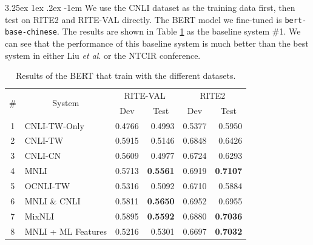 \documentclass[12pt]{article}
\makeatletter
\renewcommand\paragraph{\@startsection{paragraph}{5}{\z@}%
  {3.25ex \@plus1ex \@minus.2ex}%
  {-1em}%
  {\normalfont\normalsize\bfseries}}
\makeatother
\begin{document}
\begin{CJK*}{UTF8}{bkai}
\begin{spacing}{1.77}
\paragraph{}
We use the CNLI dataset as the training data first, then test on RITE2 and RITE-VAL directly. The BERT model we fine-tuned is \texttt{bert-base-chinese}. The results are shown in Table \ref{result:bert_compare} as the baseline system \#1. We can see that the performance of this baseline system is much better than the best system in either Liu \emph{et al}. or the NTCIR conference.

\begin{table}[H]
  \centering
  \setlength{\extrarowheight}{-3pt}
  \begin{tabular}{|c|l|r|r|r|r|}
  \hline
  \multirow{2}{*}{\#} & \multicolumn{1}{c|}{\multirow{2}{*}{System}} & \multicolumn{2}{c|}{RITE-VAL} & \multicolumn{2}{c|}{RITE2} \\ \cline{3-6}
   & \multicolumn{1}{c|}{} & \multicolumn{1}{c|}{Dev} & \multicolumn{1}{c|}{Test} & \multicolumn{1}{c|}{Dev} & \multicolumn{1}{c|}{Test} \\ \hline
  1 & CNLI-TW-Only & 0.4766 & 0.4993 & 0.5377 & 0.5950 \\ \hline
  2 & CNLI-TW & 0.5915 & 0.5146 & 0.6848 & 0.6426 \\ \hline
  3 & CNLI-CN & 0.5609 & 0.4977 & 0.6724 & 0.6293 \\ \hline
  4 & MNLI & 0.5713 & \textbf{0.5561} & 0.6919 & \textbf{0.7107} \\ \hline
  5 & OCNLI-TW & 0.5316 & 0.5092 & 0.6710 & 0.5884 \\ \hline
  6 & MNLI \& CNLI & 0.5811 & \textbf{0.5650} & 0.6952 & 0.6955 \\ \hline
  7 & MixNLI & 0.5895 & \textbf{0.5592} & 0.6880 & \textbf{0.7036} \\ \hline
  8 & MNLI + ML Features & 0.5216 & 0.5301 & 0.6697 & \textbf{0.7032} \\ \hline
  \end{tabular}
  \caption{Results of the BERT that train with the different datasets.}
  \label{result:bert_compare}
\end{table}


\end{spacing}
\end{CJK*}
\end{document}
